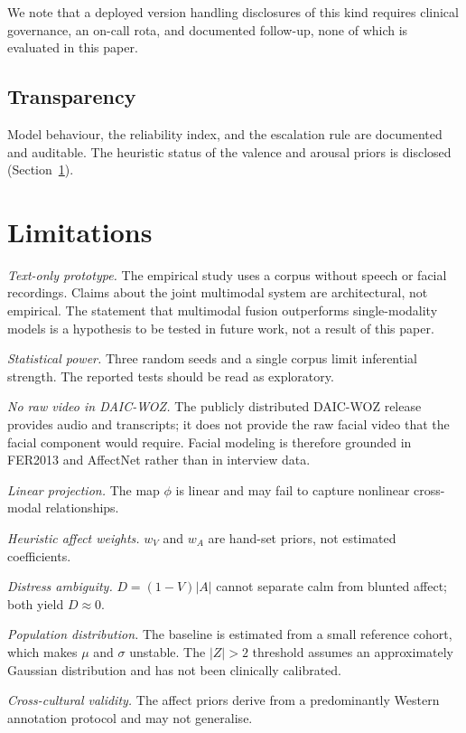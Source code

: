 \documentclass[12pt]{article}
\begin{document}
We note that a deployed version handling disclosures of this kind
requires clinical governance, an on-call rota, and documented
follow-up, none of which is evaluated in this paper.

\subsection{Transparency}

Model behaviour, the reliability index, and the escalation rule are
documented and auditable. The heuristic status of the valence and
arousal priors is disclosed (Section~\ref{sec:limitations}).

\section{Limitations}
\label{sec:limitations}

\emph{Text-only prototype.} The empirical study uses a corpus without
speech or facial recordings. Claims about the joint multimodal system
are architectural, not empirical. The statement that multimodal fusion
outperforms single-modality models is a hypothesis to be tested in
future work, not a result of this paper.

\emph{Statistical power.} Three random seeds and a single corpus limit
inferential strength. The reported tests should be read as exploratory.

\emph{No raw video in DAIC-WOZ.} The publicly distributed DAIC-WOZ
release provides audio and transcripts; it does not provide the raw
facial video that the facial component would require. Facial modeling is
therefore grounded in FER2013 and AffectNet rather than in interview
data.

\emph{Linear projection.} The map $\phi$ is linear and may fail to
capture nonlinear cross-modal relationships.

\emph{Heuristic affect weights.} $w_V$ and $w_A$ are hand-set priors,
not estimated coefficients.

\emph{Distress ambiguity.} $D = (1-V)|A|$ cannot separate calm from
blunted affect; both yield $D \approx 0$.

\emph{Population distribution.} The baseline is estimated from a small
reference cohort, which makes $\mu$ and $\sigma$ unstable. The
$|Z| > 2$ threshold assumes an approximately Gaussian distribution and
has not been clinically calibrated.

\emph{Cross-cultural validity.} The affect priors derive from a
predominantly Western annotation protocol and may not generalise.
\end{document}

